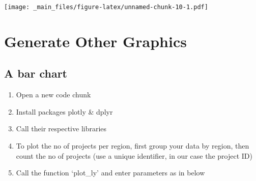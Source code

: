 \documentclass[
]{book}
\newenvironment{Shaded}{\begin{snugshade}}{\end{snugshade}}
\newcommand{\AttributeTok}[1]{\textcolor[rgb]{0.77,0.63,0.00}{#1}}
\newcommand{\DecValTok}[1]{\textcolor[rgb]{0.00,0.00,0.81}{#1}}
\newcommand{\FunctionTok}[1]{\textcolor[rgb]{0.00,0.00,0.00}{#1}}
\newcommand{\NormalTok}[1]{#1}
\newcommand{\OtherTok}[1]{\textcolor[rgb]{0.56,0.35,0.01}{#1}}
\newcommand{\SpecialCharTok}[1]{\textcolor[rgb]{0.00,0.00,0.00}{#1}}
\newcommand{\StringTok}[1]{\textcolor[rgb]{0.31,0.60,0.02}{#1}}
\providecommand{\tightlist}{%
  \setlength{\itemsep}{0pt}\setlength{\parskip}{0pt}}
\begin{document}
\texttt{[image: \_main\_files/figure-latex/unnamed-chunk-10-1.pdf]}

\hypertarget{generate-other-graphics}{%
\section{Generate Other Graphics}\label{generate-other-graphics}}

\hypertarget{a-bar-chart}{%
\subsection{A bar chart}\label{a-bar-chart}}

\begin{enumerate}
\def\labelenumi{\arabic{enumi}.}
\tightlist
\item
  Open a new code chunk
\item
  Install packages plotly \& dplyr
\item
  Call their respective libraries
\item
  To plot the no of projects per region, first group your data by region, then count the no of projects (use a unique identifier, in our case the project ID)
\item
  Call the function `plot\_ly' and enter parameters as in below
\end{enumerate}

\begin{Shaded}
\end{Shaded}
\end{document}
